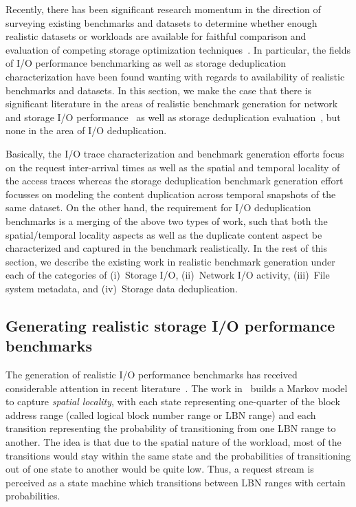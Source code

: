 Recently, there has been significant research momentum in the direction
of surveying existing benchmarks and datasets to determine whether
enough realistic datasets or workloads are available for faithful
comparison and evaluation of competing storage optimization 
techniques~\cite{generating-datasets}.
In particular, the fields of I/O performance benchmarking as well as
storage deduplication characterization have been found wanting
with regards to availability of realistic benchmarks and datasets.
In this section, we make the case that there is significant
literature in the areas of realistic benchmark generation for 
network~\cite{echo} and 
storage I/O performance~\cite{storagecharacterization, storagemodeling,
storagereplay, flexi-replay, decoupling-dc-studies,
case-for-nas-benchmarks, jump-based-synthetic, distiller} as well as storage deduplication
evaluation~\cite{generating-datasets}, but none in the area of I/O deduplication. 

Basically, 
the I/O trace characterization and benchmark generation efforts 
focus on the request inter-arrival times as well as the spatial
and temporal locality of the access traces whereas the storage
deduplication benchmark generation effort focusses on modeling
the content duplication across temporal snapshots of the same
dataset. On the other hand, the requirement for I/O deduplication
benchmarks is a merging of the above two types of work, such 
that both the spatial/temporal locality aspects as well as
the duplicate content aspect be characterized and captured 
in the benchmark realistically. In the rest of this section,
we describe the existing work in realistic benchmark generation
under each of the categories of (i)~Storage I/O, 
(ii)~Network I/O activity, 
(iii)~File system metadata,
and
(iv)~Storage data deduplication.




\subsection{Generating realistic storage I/O performance benchmarks}
The generation of realistic I/O performance benchmarks
has received considerable attention in recent literature~\cite{storagecharacterization, storagemodeling,
storagereplay, flexi-replay, decoupling-dc-studies,
jump-based-synthetic, distiller}. 
The work in~\cite{storagecharacterization}
builds a Markov model to capture \textit{spatial locality},
with each state representing one-quarter of the 
block address range (called logical block number range or LBN range) 
and each transition representing
the probability of transitioning from one LBN range to another. The idea
is that due to the spatial nature of the workload, most of the
transitions would stay within the same state and the probabilities
of transitioning out of one state to another would be quite low. 
Thus, a request stream is perceived as a state machine 
which transitions between LBN ranges with certain probabilities.


